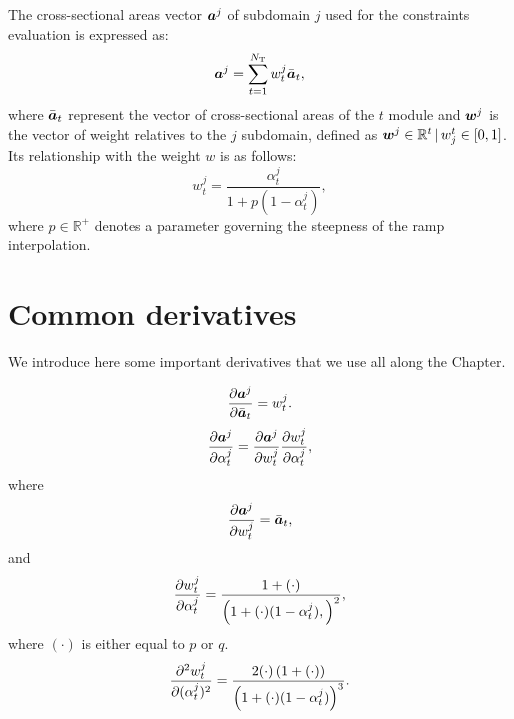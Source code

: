 The cross-sectional areas vector $\bm{a}^j$ of subdomain $j$ used for the constraints evaluation is expressed as:  
\begin{equation}
    \bm{a}^j = \sum_{t=1}^{N_\text{T}} w_t^j \bar{\bm{a}}_t, 
\end{equation}
where $\bar{\bm{a}}_t $ represent the vector of cross-sectional areas of the $t$ module and $\bm{w}^j$ is the vector of weight relatives to the $j$ subdomain, defined as $ \bm{w}^j \in \mathbb{R}^t\,|\,w_j^t \in [0,1]$. Its relationship with the weight $w$ is as follows:
\begin{equation}
    w_t^j = \frac{\alpha_t^j}{1+p(1-\alpha_t^j)},    
\end{equation}
where $p \in \mathbb{R}^+$ denotes a parameter governing the steepness of the \gls{ramp} interpolation.

\section{Common derivatives}
We introduce here some important derivatives that we use all along the Chapter.

\begin{equation}
    \frac{\partial\bm{a}^j}{\partial\bar{\bm{a}}_t} = w_t^j.
    \label{eq:appA_02}
\end{equation}
\begin{equation}
    \frac{\partial\bm{a}^j}{\partial\alpha_t^j} =  \frac{\partial\bm{a}^j}{\partial w_t^j} \frac{\partial w_t^j}{\partial\alpha_t^j},
    \label{eq:appA_03}
\end{equation}
where
\begin{equation}
    \frac{\partial\bm{a}^j}{\partial w_t^j} = \bar{\bm{a}}_t,
\end{equation}
and
\begin{equation}
    \frac{\partial w_t^j}{\partial\alpha_t^j} = \frac{1+(\cdot)}{\left(1+(\cdot)(1-\alpha_t^j),\right)^2},
    \label{eq:appA_01}
\end{equation}
where $(\cdot)$ is either equal to $p$ or $q$.
\begin{equation}
    \frac{\partial^2w_t^j}{\partial(\alpha_t^j)^2} = \frac{2(\cdot)\left(1+(\cdot)\right)}{\left(1+(\cdot)(1-\alpha_t^j)\right)^3}.
    \label{eq:appA_04}
\end{equation}


